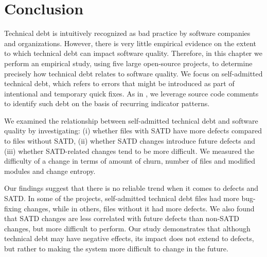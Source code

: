 \section{Conclusion}
\label{chap3:sec:conclusion}



Technical debt is intuitively recognized as bad practice by software companies and organizations. However, there is very little empirical evidence on the extent to which technical debt can impact software quality. Therefore, in this chapter we perform an empirical study, using five large open-source projects, to determine precisely how technical debt relates to software quality. We focus on self-admitted technical debt, which refers to  errors that might be introduced as part of intentional and temporary quick fixes. As in  \cite{ICSM_PotdarS14}, we leverage source code comments to identify such debt on the basis of recurring indicator patterns.


We examined the relationship between self-admitted technical debt and software quality by investigating: (i) whether files with SATD have more defects compared to files without SATD, (ii) whether SATD changes introduce future defects and (iii) whether SATD-related changes tend to be more difficult. We measured the difficulty of a change in terms of amount of churn, number of files and modified modules and change entropy.




Our findings suggest that there is no reliable trend when it comes to defects and SATD. In some of the projects, self-admitted technical debt files had more bug-fixing changes, while in others, files without it had more defects. We also found that SATD changes are less correlated with future defects than non-SATD changes, but more difficult to perform. 
Our study demonstrates that although technical debt may have negative effects, its impact does not extend to defects, but rather to making the system more difficult to change in the future.


